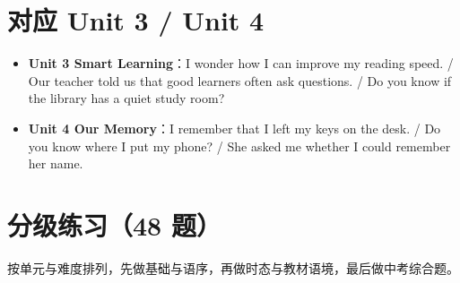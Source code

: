 \documentclass[11pt,a4paper]{ctexart}
\begin{document}
\section{对应 Unit 3 / Unit 4}
\begin{itemize}[leftmargin=1.4em]
\item \textbf{Unit 3 Smart Learning}：I wonder how I can improve my reading speed. / Our teacher told us that good learners often ask questions. / Do you know if the library has a quiet study room?
\item \textbf{Unit 4 Our Memory}：I remember that I left my keys on the desk. / Do you know where I put my phone? / She asked me whether I could remember her name.
\end{itemize}

\newpage
\section{分级练习（48 题）}
\noindent 按单元与难度排列，先做基础与语序，再做时态与教材语境，最后做中考综合题。
\end{document}
